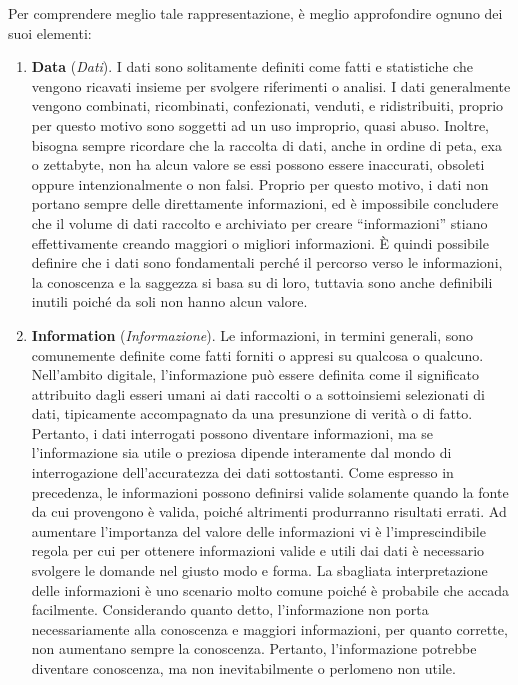 Per comprendere meglio tale rappresentazione, è meglio approfondire ognuno dei suoi elementi:\cite{researchgate_revising_dikw_pyramid}
\begin{enumerate}
    \item \textbf{Data} (\textit{Dati}). I dati sono solitamente definiti come fatti e statistiche che vengono ricavati insieme per svolgere riferimenti o analisi. I dati generalmente vengono combinati, ricombinati, confezionati, venduti, e ridistribuiti, proprio per questo motivo sono soggetti ad un uso improprio, quasi abuso. Inoltre, bisogna sempre ricordare che la raccolta di dati, anche in ordine di peta, exa o zettabyte, non ha alcun valore se essi possono essere inaccurati, obsoleti oppure intenzionalmente o non falsi. Proprio per questo motivo, i dati non portano sempre delle direttamente informazioni, ed è impossibile concludere che il volume di dati raccolto e archiviato per creare “informazioni” stiano effettivamente creando maggiori o migliori informazioni. È quindi possibile definire che i dati sono fondamentali perché il percorso verso le informazioni, la conoscenza e la saggezza si basa su di loro, tuttavia sono anche definibili inutili poiché da soli non hanno alcun valore.
    \item \textbf{Information} (\textit{Informazione}). Le informazioni, in termini generali, sono comunemente definite come fatti forniti o appresi su qualcosa o qualcuno. Nell'ambito digitale, l'informazione può essere definita come il significato attribuito dagli esseri umani ai dati raccolti o a sottoinsiemi selezionati di dati, tipicamente accompagnato da una presunzione di verità o di fatto. Pertanto, i dati interrogati possono diventare informazioni, ma se l'informazione sia utile o preziosa dipende interamente dal mondo di interrogazione dell'accuratezza dei dati sottostanti. Come espresso in precedenza, le informazioni possono definirsi valide solamente quando la fonte da cui provengono è valida, poiché altrimenti produrranno risultati errati. Ad aumentare l'importanza del valore delle informazioni vi è l'imprescindibile regola per cui per ottenere informazioni valide e utili dai dati è necessario svolgere le domande nel giusto modo e forma. La sbagliata interpretazione delle informazioni è uno scenario molto comune poiché è probabile che accada facilmente. Considerando quanto detto, l'informazione non porta necessariamente alla conoscenza e maggiori informazioni, per quanto corrette, non aumentano sempre la conoscenza. Pertanto, l'informazione potrebbe diventare conoscenza, ma non inevitabilmente o perlomeno non utile.

\end{enumerate}
